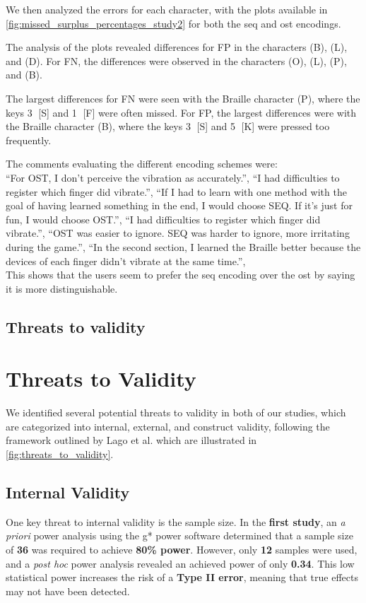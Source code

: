 We then analyzed the errors for each character, with the plots available in \autoref{fig:missed_surplus_percentages_study2} for both the \gls{seq} and \gls{ost} encodings.

The analysis of the plots revealed differences for FP in the characters (B), (L), and (D). For FN, the differences were observed in the characters (O), (L), (P), and (B).

The largest differences for FN were seen with the Braille character (P), where the keys \textcircled{3} [S] and \textcircled{1} [F] were often missed. For FP, the largest differences were with the Braille character (B), where the keys \textcircled{3} [S] and \textcircled{5} [K] were pressed too frequently.

The comments evaluating the different encoding schemes were:\\
\enquote{For OST, I don't perceive the vibration as accurately.},
\enquote{I had difficulties to register which finger did vibrate.},
\enquote{If I had to learn with one method with the goal of having learned something in the end, I would choose SEQ. If it's just for fun, I would choose OST.},
\enquote{I had difficulties to register which finger did vibrate.},
\enquote{OST was easier to ignore. SEQ was harder to ignore, more irritating during the game.},
\enquote{In the second section, I learned the Braille better because the devices of each finger didn’t vibrate at the same time.},
\\
This shows that the users seem to prefer the \gls{seq} encoding over the \gls{ost} by saying it is more distinguishable.


\subsection{Threats to validity}
\section{Threats to Validity}

We identified several potential threats to validity in both of our studies, which are categorized into internal, external, and construct validity, following the framework outlined by Lago et al. \cite{10.1145/3674805.3686691} which are illustrated in \autoref{fig:threats_to_validity}.

\subsection{Internal Validity}
One key threat to internal validity is the sample size. In the \textbf{first study}, an \textit{a priori} power analysis using the g* power software determined that a sample size of \textbf{36} was required to achieve \textbf{80\% power}. However, only \textbf{12} samples were used, and a \textit{post hoc} power analysis revealed an achieved power of only \textbf{0.34}. This low statistical power increases the risk of a \textbf{Type II error}, meaning that true effects may not have been detected. 

